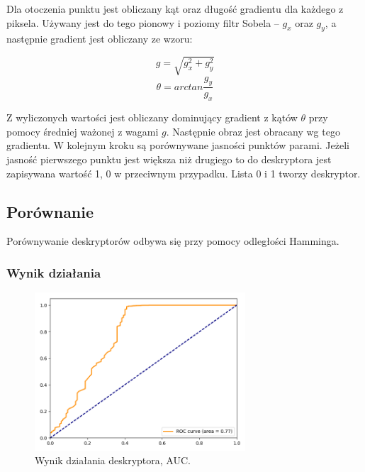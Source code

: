 \documentclass[a4paper,11pt]{article}
\begin{document}
Dla otoczenia punktu jest obliczany kąt oraz długość gradientu dla każdego z piksela. Używany jest do tego pionowy i poziomy filtr Sobela -- $g_x$ oraz $g_y$, a następnie gradient jest obliczany ze wzoru:

$$ g = \sqrt{g_x^2 + g_y^2}$$
$$ \theta =arctan \frac{g_y}{g_x}$$

Z wyliczonych wartości jest obliczany dominujący gradient z kątów $\theta$ przy pomocy średniej ważonej z wagami $g$. Następnie obraz jest obracany wg tego gradientu. W kolejnym kroku są porównywane jasności punktów parami. Jeżeli jasność pierwszego punktu jest większa niż drugiego to do deskryptora jest zapisywana wartość 1, 0 w przeciwnym przypadku. Lista 0 i 1 tworzy deskryptor.


\subsection{Porównanie}
Porównywanie deskryptorów odbywa się przy pomocy odległości Hamminga.

\subsubsection{Wynik działania}

\begin{figure}[H]
\begin{center}
\includegraphics[width=0.7\textwidth]{./img/brief.png}
\end{center}
\caption{Wynik działania deskryptora, AUC.}
\end{figure}
\end{document}

